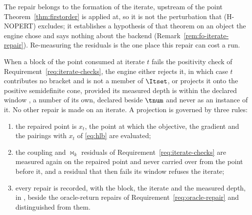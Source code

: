 
The repair belongs to the formation of the iterate, upstream of the point
Theorem~\ref{thm:firstorder} is applied at, so it is not the perturbation
that (H-NOPERT) excludes; it establishes a hypothesis of that theorem on an
object the engine chose and says nothing about the backend
(Remark~\ref{rem:fo-iterate-repair}). Re-measuring the residuals is the one
place this repair can cost a run.

\begin{requirement}\label{req:iterate-repair}
When a block of the point consumed at iterate $t$ fails the positivity check
of Requirement~\ref{req:iterate-checks}, the engine either rejects it, in
which case $t$ contributes no bracket and is not a member of $\Itset$, or
projects it onto the positive semidefinite cone, provided its measured depth
is within the declared window , a number of its
own, declared beside $\tnum$ and never as an instance of it. No other repair
is made on an iterate. A projection is governed by three rules:
\begin{enumerate}[label=(\roman*),leftmargin=2.4em]
\item the repaired point is $x_t$, the point at which the objective, the
  gradient and the pairings with $x_t$ of \eqref{eq:hlb} are evaluated;
\item the coupling and $\bowtie_k$ residuals of
  Requirement~\ref{req:iterate-checks} are measured again on the repaired
  point and never carried over from the point before it, and a residual that
  then fails its window refuses the iterate;
\item every repair is recorded, with the block, the iterate and the measured
  depth, in , beside the oracle-return repairs
  of Requirement~\ref{req:oracle-repair} and distinguished from them.
\end{enumerate}
\end{requirement}
